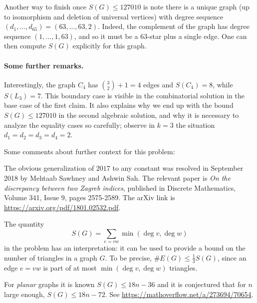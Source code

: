 \documentclass[11pt]{scrartcl}
\begin{document}
\begin{remark*}
  Another way to finish once $S(G) \le 127010$
  is note there is a unique graph
  (up to isomorphism and deletion of universal vertices)
  with degree sequence
  $(d_1, \dots, d_{65}) = (63, \dots, 63, 2)$.
  Indeed, the complement of the graph
  has degree sequence $(1, \dots, 1, 63)$,
  and so it must be a $63$-star plus a single edge.
  One can then compute $S(G)$ explicitly for this graph.
\end{remark*}

\paragraph{Some further remarks.}

\begin{remark*}
  Interestingly, the graph $C_4$ has $\binom 32+1 = 4$ edges
  and $S(C_4) = 8$, while $S(L_3) = 7$.
  This boundary case is visible in the combinatorial solution
  in the base case of the first claim.
  It also explains why we end up with the bound $S(G) \le 127010$
  in the second algebraic solution,
  and why it is necessary to analyze the equality cases so carefully;
  observe in $k=3$ the situation $d_1 = d_2 = d_3 = d_4 = 2$.
\end{remark*}

\begin{remark*}
  Some comments about further context for this problem:
  \begin{itemize}
  \ii The obvious generalization of $2017$ to any constant
  was resolved in September 2018 by Mehtaab Sawhney and Ashwin Sah.
  The relevant paper is
  \emph{On the discrepancy between two Zagreb indices},
  published in Discrete Mathematics, Volume 341, Issue 9, pages 2575-2589.
  The arXiv link is \url{https://arxiv.org/pdf/1801.02532.pdf}.

  \ii The quantity
  \[ S(G) = \sum_{e = vw} \min \left( \deg v, \deg w \right) \]
  in the problem has an interpretation:
  it can be used to provide a bound on the
  number of triangles in a graph $G$.
  To be precise, $\# E(G) \le \frac 13 S(G)$,
  since an edge $e = vw$ is part of at most $\min(\deg v, \deg w)$ triangles.

  \ii For \emph{planar} graphs it is known $S(G) \le 18n-36$
  and it is conjectured that for $n$ large enough, $S(G) \le 18n-72$.
  See \url{https://mathoverflow.net/a/273694/70654}.
  \end{itemize}
\end{remark*}
\end{document}
